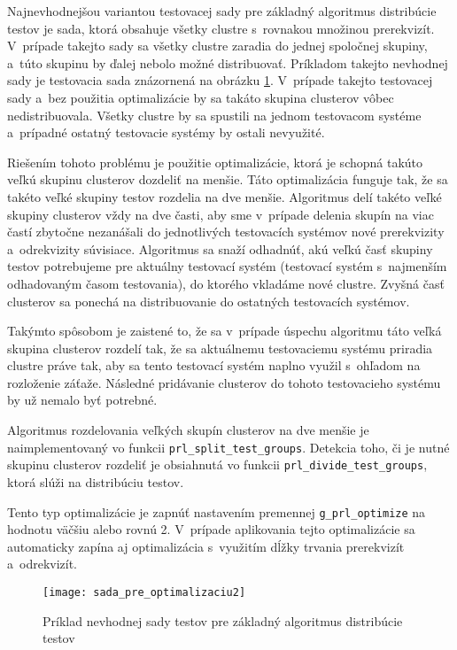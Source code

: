Najnevhodnejšou variantou testovacej sady pre základný algoritmus distribúcie
testov je sada, ktorá obsahuje všetky clustre s~rovnakou množinou prerekvizít. 
V~prípade takejto sady sa všetky clustre zaradia do jednej spoločnej skupiny, a~túto skupinu
by ďalej nebolo možné distribuovať. Príkladom takejto nevhodnej sady je
testovacia sada znázornená na obrázku \ref{obrazok:sada_pre_optimalizaciu2}.
V~prípade takejto testovacej sady a~bez použitia optimalizácie by 
sa takáto skupina clusterov vôbec nedistribuovala. Všetky clustre by sa spustili
na jednom testovacom systéme a~prípadné ostatný testovacie systémy by ostali nevyužité.

Riešením tohoto problému je použitie optimalizácie, ktorá je schopná takúto
veľkú skupinu clusterov dozdeliť na menšie. Táto optimalizácia funguje tak,
že sa takéto veľké skupiny testov rozdelia na dve menšie. Algoritmus delí takéto veľké 
skupiny clusterov vždy na dve časti, aby sme v~prípade delenia skupín na viac častí
zbytočne nezanášali do jednotlivých testovacích systémov nové prerekvizity a~odrekvizity
súvisiace. Algoritmus sa snaží odhadnúť, akú veľkú časť skupiny testov potrebujeme
pre aktuálny testovací systém (testovací systém s~najmenším odhadovaným časom testovania), 
do ktorého vkladáme nové clustre. Zvyšná časť clusterov sa ponechá na 
distribuovanie do ostatných testovacích systémov. 

Takýmto spôsobom je zaistené to, že sa v~prípade úspechu algoritmu táto veľká skupina
clusterov rozdelí tak, že sa aktuálnemu testovaciemu systému priradia clustre práve tak,
aby sa tento testovací systém naplno využil s~ohľadom na rozloženie záťaže.
Následné pridávanie clusterov do tohoto testovacieho systému by už nemalo byť potrebné.

Algoritmus rozdelovania veľkých skupín clusterov na dve menšie je naimplementovaný vo funkcii
\texttt{prl\_split\_test\_groups}.
Detekcia toho, či je nutné skupinu clusterov rozdeliť je obsiahnutá vo funkcii \texttt{prl\_divide\_test\_groups},
ktorá slúži na distribúciu testov.

Tento typ optimalizácie je zapnúť nastavením premennej \texttt{g\_prl\_optimize} na hodnotu 
väčšiu alebo rovnú 2. V~prípade aplikovania tejto optimalizácie sa automaticky zapína
aj optimalizácia s~využitím dĺžky trvania prerekvizít a~odrekvizít.


\begin{figure}[h]
  \begin{center}
    \texttt{[image: sada\_pre\_optimalizaciu2]}
    \caption{Príklad nevhodnej sady testov pre základný algoritmus distribúcie testov}
    \label{obrazok:sada_pre_optimalizaciu2}
  \end{center}
\end{figure}



